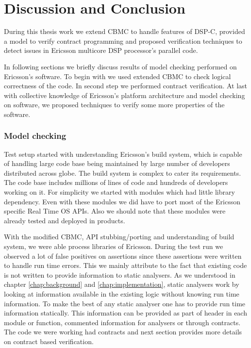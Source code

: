 
\chapter{Discussion and Conclusion} \label{chapter:discussion}


During this thesis work we extend CBMC to handle features of DSP-C, provided a model to verify contract programming and proposed verification techniques to detect issues in Ericsson multicore DSP processor's parallel code.

In following sections we briefly discuss results of model checking performed on Ericsson's software. To begin with we used extended CBMC to check logical correctness of the code. In second step we performed contract verification. At last with collective knowledge of Ericsson's platform architecture and model checking on software, we proposed techniques to verify some more properties of the software.

\subsection{Model checking}
Test setup started with understanding Ericsson's build system, which is capable of handling large code base being maintained by large number of developers distributed across globe. The build system is complex to cater its requirements. The code base includes millions of lines of code and hundreds of developers working on it. For simplicity we started with modules which had little library dependency. Even with these modules we did have to port most of the Ericsson specific Real Time OS APIs. Also we should note that these modules were already tested and deployed in products.

With the modified CBMC, API stubbing/porting and understanding of build system, we were able process libraries of Ericsson. During the test run we observed a lot of false positives on assertions since these assertions were written to handle run time errors. This we mainly attribute to the fact that existing code is not written to provide information to static analysers. As we understood in chapter \autoref{chap:background} and \autoref{chap:implementation}, static analysers work by looking at information available in the existing logic without knowing run time information. To make the best of any static analyser one has to provide run time information statically. This information can be provided as part of header in each module or function, commented information for analysers or through contracts. The code we were working had contracts and next section provides more details on contract based verification.

